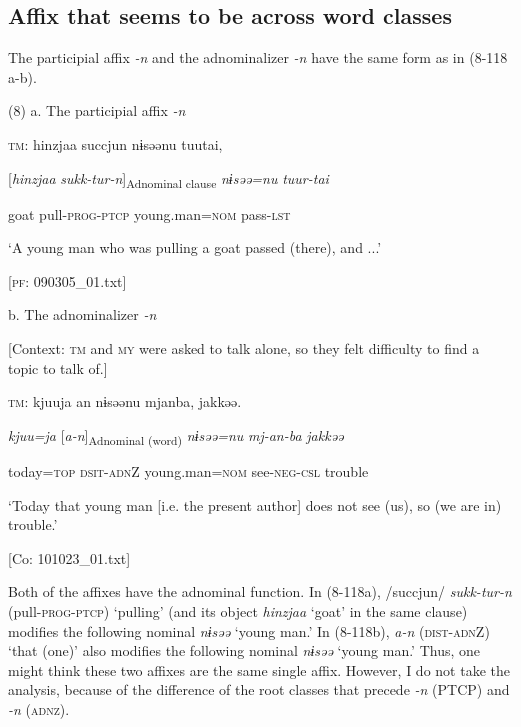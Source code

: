 \subsection{Affix that seems to be across word classes}

The participial affix \textit{{}-n} and the adnominalizer \textit{{}-n} have the same form as in (8-118 a-b).

(8)  a. The participial affix \textit{{}-n}

  \textsc{tm}:   hinzjaa  succjun  nɨsəənu  tuutai,

    [\textit{hinzjaa}  \textit{sukk-tur-n}]\textsubscript{Adnominal clause}  \textit{nɨsəə=nu}  \textit{tuur-tai}

    goat  pull-\textsc{prog}-\textsc{ptcp}  young.man=\textsc{nom}  pass-\textsc{lst}

    ‘A young man who was pulling a goat passed (there), and ...’

  [\textsc{pf}: 090305\_01.txt]

  b. The adnominalizer \textit{{}-n}

  [Context: \textsc{tm} and \textsc{my} were asked to talk alone, so they felt difficulty to find a topic to talk of.]

  \textsc{tm}:   kjuuja  an  nɨsəənu  mjanba,  jakkəə.

    \textit{kjuu=ja}  [\textit{a-n}]\textsubscript{Adnominal (word)}  \textit{nɨsəə=nu}  \textit{mj-an-ba}  \textit{jakkəə}

    today=\textsc{top}  \textsc{dsit}-\textsc{adn}Z  young.man=\textsc{nom}  see-\textsc{neg}-\textsc{csl}  trouble

    ‘Today that young man [i.e. the present author] does not see (us), so (we are in) trouble.’

  [Co: 101023\_01.txt]

Both of the affixes have the adnominal function. In (8\nobreakdash-118a), /succjun/ \textit{sukk-tur-n} (pull-\textsc{prog}-\textsc{ptcp}) ‘pulling’ (and its object \textit{hinzjaa} ‘goat’ in the same clause) modifies the following nominal \textit{nɨsəə} ‘young man.’ In (8\nobreakdash-118b), \textit{a-n} (\textsc{dist}-\textsc{adn}Z) ‘that (one)’ also modifies the following nominal \textit{nɨsəə} ‘young man.’ Thus, one might think these two affixes are the same single affix. However, I do not take the analysis, because of the difference of the root classes that precede \textit{{}-n} (PTCP) and \textit{-n} (\textsc{adnz}).

